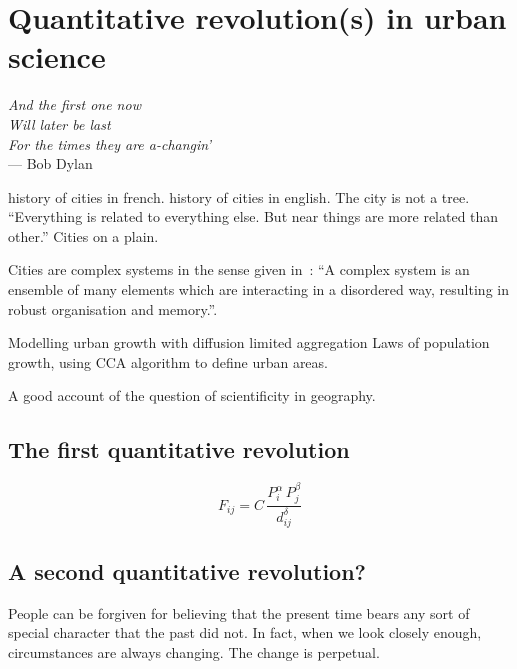 


\chapter{Quantitative revolution(s) in urban science}
\label{chap:quantitative_revolutions}

\begin{flushright}{\slshape    
And the first one now\\
Will later be last\\
For the times they are a-changin'} \\ \medskip
--- Bob Dylan 
\end{flushright}

\cite{Bairoch:1985} history of cities in french.
\cite{Mumford:1961} history of cities in english.
\cite{Alexander:1964} The city is not a tree.
\cite{Tobler:1970} ``Everything is related to everything else. But near things
are more related than other.''
\cite{Glass:1971} Cities on a plain.


Cities are complex systems in the sense given in~\cite{Ladyman:2013}: ``A complex system is an ensemble of many elements
which are interacting in a disordered way, resulting in robust organisation and
memory.''.


\cite{Makse:1995} Modelling urban growth with diffusion limited aggregation
\cite{Rozenfeld:2008} Laws of population growth, using CCA algorithm to define
urban areas.

\cite{Sanders:2011} A good account of the question of scientificity in
geography.

\section{The first quantitative revolution}
\label{sec:the_first_quantitative_revolution}


\begin{equation}
    F_{ij} = C\, \frac{P_i^\alpha\,P_j^\beta}{d_{ij}^\delta}
\end{equation}

\section{A second quantitative revolution?}
\label{sec:a_second_quantitative_revolution_}

People can be forgiven for believing that the present time bears any sort of
special character that the past did not. In fact, when we look closely enough,
circumstances are always changing. The change is perpetual. 


